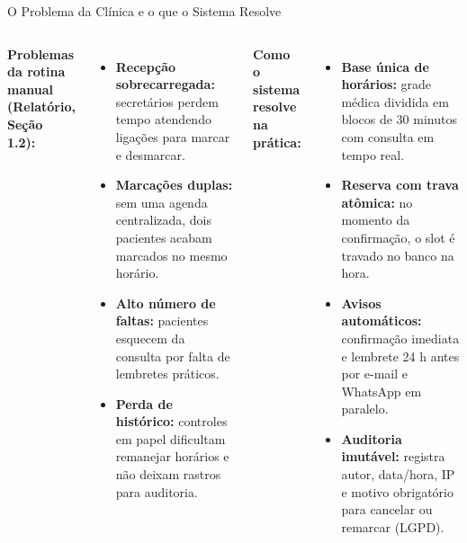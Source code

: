\documentclass[aspectratio=169,t,xcolor=table]{beamer}
\newcommand{\setLayoutClean}{%
    \usebackgroundtemplate{}%
    \setDefaultConfig%
}
\begin{document}
\setLayoutClean
\begin{frame}{O Problema da Clínica e o que o Sistema Resolve}
    \begin{columns}[T]
        \textbf{Problemas da rotina manual (Relatório, Seção 1.2):}
        {\footnotesize
        \begin{itemize}\setlength{\itemsep}{2pt}
            \item \textbf{Recepção sobrecarregada:} secretários perdem tempo atendendo ligações para marcar e desmarcar.
            \item \textbf{Marcações duplas:} sem uma agenda centralizada, dois pacientes acabam marcados no mesmo horário.
            \item \textbf{Alto número de faltas:} pacientes esquecem da consulta por falta de lembretes práticos.
            \item \textbf{Perda de histórico:} controles em papel dificultam remanejar horários e não deixam rastros para auditoria.
        \end{itemize}
        }

        \textbf{Como o sistema resolve na prática:}
        {\footnotesize
        \begin{itemize}\setlength{\itemsep}{2pt}
            \item \textbf{Base única de horários:} grade médica dividida em blocos de 30 minutos com consulta em tempo real.
            \item \textbf{Reserva com trava atômica:} no momento da confirmação, o slot é travado no banco na hora.
            \item \textbf{Avisos automáticos:} confirmação imediata e lembrete 24 h antes por e-mail e WhatsApp em paralelo.
            \item \textbf{Auditoria imutável:} registra autor, data/hora, IP e motivo obrigatório para cancelar ou remarcar (LGPD).
        \end{itemize}
        }
    \end{columns}
\end{frame}
\end{document}
